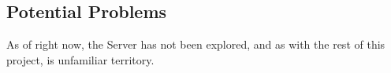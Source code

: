 \subsection{Potential Problems}
As of right now, the Server has not been explored, and as with the rest of this project, is unfamiliar territory. 
